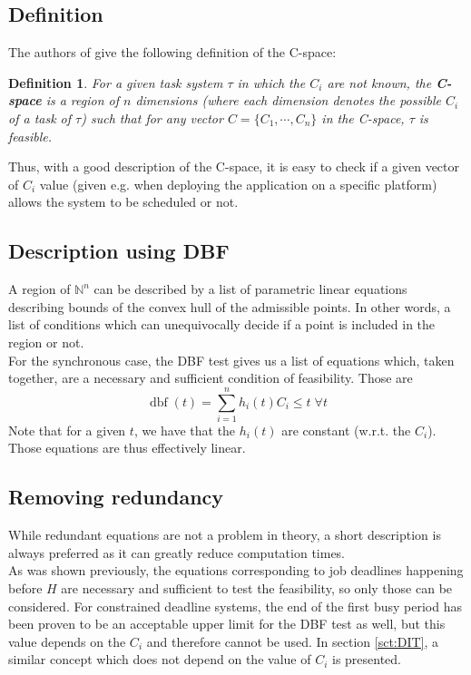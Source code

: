 \documentclass[a4paper,10pt]{article}
\newcommand{\dbf}[1]{\operatorname{dbf}(#1)}
\newtheorem{definition}{Definition}
\begin{document}
\subsection{Definition}

The authors of \cite{george2009characterization} give the following definition of the C-space:
\begin{definition}
For a given task system $\tau$ in which the $C_i$ are not known, the \textbf{C-space} is a region of $n$ dimensions (where each dimension denotes the possible $C_i$ of a task of $\tau$) such that for any vector $C = \{ C_1, \cdots, C_n\}$ in the C-space, $\tau$ is feasible.
\end{definition}

Thus, with a good description of the C-space, it is easy to check if a given vector of $C_i$ value (given e.g. when deploying the application on a specific platform) allows the system to be scheduled or not.

\subsection{Description using DBF}

A region of $\mathbb{N}^n$ can be described by a list of parametric linear equations describing bounds of the convex hull of the admissible points. In other words, a list of conditions which can unequivocally decide if a point is included in the region or not.\\

For the synchronous case, the DBF test gives us a list of equations which, taken together, are a necessary and sufficient condition of feasibility. Those are
$$\dbf{t} = \sum_{i=1}^{n} h_i(t) C_i \leq t \; \forall t$$
Note that for a given $t$, we have that the $h_i(t)$ are constant (w.r.t. the $C_i$). Those equations are thus effectively linear.\\

\subsection{Removing redundancy}

While redundant equations are not a problem in theory, a short description is always preferred as it can greatly reduce computation times.\\

As was shown previously, the equations corresponding to job deadlines happening before $H$ are necessary and sufficient to test the feasibility, so only those can be considered. For constrained deadline systems, the end of the first busy period has been proven to be an acceptable upper limit for the DBF test as well, but this value depends on the $C_i$ and therefore cannot be used. In section \ref{sct:DIT}, a similar concept which does not depend on the value of $C_i$ is presented.
\end{document}
